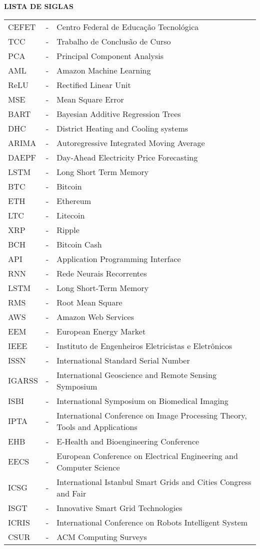 \begin{center}
\textbf{\large LISTA DE SIGLAS}
\end{center}
\vspace{0.5cm}
\singlespacing
\noindent
\begin{tabular}{l c p{.85\linewidth}}
CEFET & - & Centro Federal de Educação Tecnológica \\
TCC & - & Trabalho de Conclusão de Curso \\
PCA & - & Principal Component Analysis \\
AML & - & Amazon Machine Learning \\
ReLU & - & Rectified Linear Unit \\
MSE & - & Mean Square Error \\
BART & - & Bayesian Additive Regression Trees \\
DHC & - & District Heating and Cooling systems \\
ARIMA & - & Autoregressive Integrated Moving Average \\
DAEPF & - & Day-Ahead Electricity Price Forecasting \\
LSTM & - & Long Short Term Memory \\
BTC & - & Bitcoin \\
ETH & - & Ethereum \\
LTC & - & Litecoin \\
XRP & - & Ripple \\
BCH & - & Bitcoin Cash \\
API & - & Application Programming Interface \\
RNN & - & Rede Neurais Recorrentes \\
LSTM & - & Long Short-Term Memory \\
RMS & - & Root Mean Square \\
AWS & - & Amazon Web Services \\
EEM & - & European Energy Market \\
IEEE & - & Instituto de Engenheiros Eletricistas e Eletrônicos \\
ISSN & - & International Standard Serial Number \\
IGARSS & - & International Geoscience and Remote Sensing Symposium  \\
ISBI & - & International Symposium on Biomedical Imaging \\
IPTA & - & International Conference on Image Processing Theory, Tools and Applications \\
EHB & - & E-Health and Bioengineering Conference \\
EECS & - & European Conference on Electrical Engineering and Computer Science \\
ICSG & - & International Istanbul Smart Grids and Cities Congress and Fair \\
ISGT & - & Innovative Smart Grid Technologies \\
ICRIS & - & International Conference on Robots Intelligent System \\
CSUR & - & ACM Computing Surveys \\
\end{tabular}

\onehalfspacing